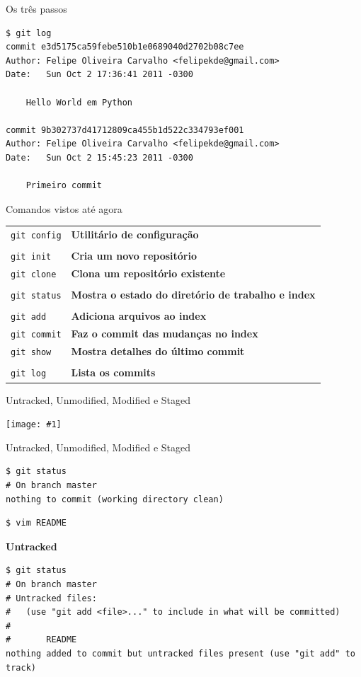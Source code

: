 \documentclass[portuguese,brazil]{beamer}
\newcommand\img[1]{
  \begin{center}
    \texttt{[image: \#1]}
  \end{center}
}
\begin{document}
\begin{frame}[fragile]{Os três passos}
\small{
\begin{verbatim}
$ git log
commit e3d5175ca59febe510b1e0689040d2702b08c7ee
Author: Felipe Oliveira Carvalho <felipekde@gmail.com>
Date:   Sun Oct 2 17:36:41 2011 -0300

    Hello World em Python

commit 9b302737d41712809ca455b1d522c334793ef001
Author: Felipe Oliveira Carvalho <felipekde@gmail.com>
Date:   Sun Oct 2 15:45:23 2011 -0300

    Primeiro commit

\end{verbatim}
}
\end{frame}

\begin{frame}{Comandos vistos até agora}
  \begin{center}
    \begin{tabular}{l   l}
      \texttt{git config} & \textbf{Utilitário de configuração} \\
      \pause \\
      \texttt{git init} & \textbf{Cria um novo repositório} \\
      \texttt{git clone} & \textbf{Clona um repositório existente} \\
      \pause \\
      \texttt{git status} & \textbf{Mostra o estado do diretório de trabalho e index} \\
      \pause \\
      \texttt{git add} & \textbf{Adiciona arquivos ao index} \\
      \texttt{git commit} & \textbf{Faz o commit das mudanças no index} \\
      \texttt{git show} & \textbf{Mostra detalhes do último commit} \\
      \pause \\
      \texttt{git log} & \textbf{Lista os commits}
    \end{tabular}
  \end{center}
\end{frame}

\begin{frame}{Untracked, Unmodified, Modified e Staged}
  \img{images/filelifecycle.png}
\end{frame}

\begin{frame}[fragile]{Untracked, Unmodified, Modified e Staged}
\begin{verbatim}
$ git status
# On branch master
nothing to commit (working directory clean)
\end{verbatim}
\pause
\begin{verbatim}
$ vim README
\end{verbatim}
\pause
\textbf{Untracked}
\begin{verbatim}
$ git status
# On branch master
# Untracked files:
#   (use "git add <file>..." to include in what will be committed)
#
#       README
nothing added to commit but untracked files present (use "git add" to track)
\end{verbatim}
\end{frame}
\end{document}
